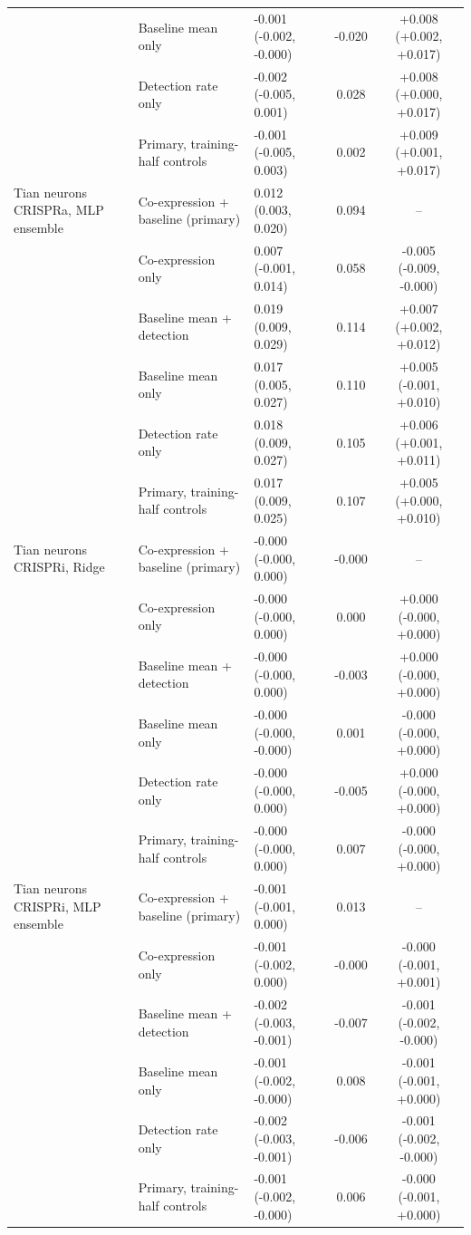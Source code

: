 \begin{tabular}{lllcc}
 & Baseline mean only & -0.001 (-0.002, -0.000) & -0.020 & +0.008 (+0.002, +0.017) \\
 & Detection rate only & -0.002 (-0.005, 0.001) & 0.028 & +0.008 (+0.000, +0.017) \\
 & Primary, training-half controls & -0.001 (-0.005, 0.003) & 0.002 & +0.009 (+0.001, +0.017) \\
Tian neurons CRISPRa, MLP ensemble & Co-expression + baseline (primary) & 0.012 (0.003, 0.020) & 0.094 & -- \\
 & Co-expression only & 0.007 (-0.001, 0.014) & 0.058 & -0.005 (-0.009, -0.000) \\
 & Baseline mean + detection & 0.019 (0.009, 0.029) & 0.114 & +0.007 (+0.002, +0.012) \\
 & Baseline mean only & 0.017 (0.005, 0.027) & 0.110 & +0.005 (-0.001, +0.010) \\
 & Detection rate only & 0.018 (0.009, 0.027) & 0.105 & +0.006 (+0.001, +0.011) \\
 & Primary, training-half controls & 0.017 (0.009, 0.025) & 0.107 & +0.005 (+0.000, +0.010) \\
Tian neurons CRISPRi, Ridge & Co-expression + baseline (primary) & -0.000 (-0.000, 0.000) & -0.000 & -- \\
 & Co-expression only & -0.000 (-0.000, 0.000) & 0.000 & +0.000 (-0.000, +0.000) \\
 & Baseline mean + detection & -0.000 (-0.000, 0.000) & -0.003 & +0.000 (-0.000, +0.000) \\
 & Baseline mean only & -0.000 (-0.000, -0.000) & 0.001 & -0.000 (-0.000, +0.000) \\
 & Detection rate only & -0.000 (-0.000, 0.000) & -0.005 & +0.000 (-0.000, +0.000) \\
 & Primary, training-half controls & -0.000 (-0.000, 0.000) & 0.007 & -0.000 (-0.000, +0.000) \\
Tian neurons CRISPRi, MLP ensemble & Co-expression + baseline (primary) & -0.001 (-0.001, 0.000) & 0.013 & -- \\
 & Co-expression only & -0.001 (-0.002, 0.000) & -0.000 & -0.000 (-0.001, +0.001) \\
 & Baseline mean + detection & -0.002 (-0.003, -0.001) & -0.007 & -0.001 (-0.002, -0.000) \\
 & Baseline mean only & -0.001 (-0.002, -0.000) & 0.008 & -0.001 (-0.001, +0.000) \\
 & Detection rate only & -0.002 (-0.003, -0.001) & -0.006 & -0.001 (-0.002, -0.000) \\
 & Primary, training-half controls & -0.001 (-0.002, -0.000) & 0.006 & -0.000 (-0.001, +0.000) \\
\bottomrule
\end{tabular}